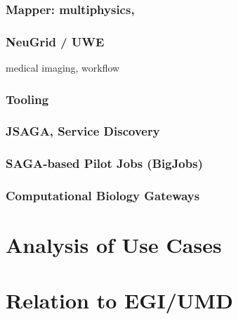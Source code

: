 \documentclass[12pt]{article}
\begin{document}
   \subsubsection*{Mapper: multiphysics,}
   \subsubsection*{NeuGrid / UWE} medical imaging, workflow
  
  \subsubsection{Tooling}
   \subsubsection*{JSAGA, Service Discovery}
   \subsubsection*{SAGA-based Pilot Jobs (BigJobs)}
   \subsubsection*{Computational Biology Gateways}


\section{Analysis of Use Cases}

\section{Relation to EGI/UMD}



\end{document}
